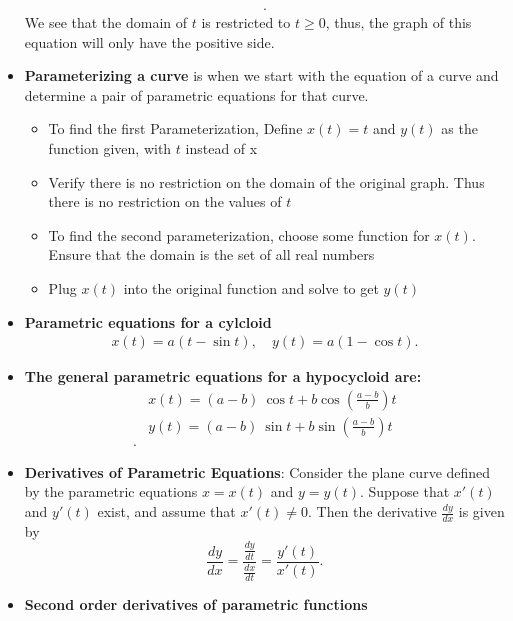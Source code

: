 \documentclass{report}
\begin{document}
\begin{itemize}
\begin{align*}
            .\end{align*}
            We see that the domain of $t$ is restricted to  $t \geq 0$, thus, the graph of this equation will only have the positive side.
        \item \textbf{Parameterizing a curve} is when we start with the equation of a curve and determine a pair of parametric equations for that curve.
            \begin{itemize}
                \item To find the first Parameterization, Define $x(t) = t $ and $y(t)$ as the function given, with $t$ instead of x 
                \item Verify there is no restriction on the domain of the original graph. Thus there is no restriction on the values of $t $
            \end{itemize}
            \begin{itemize}
                \item To find the second parameterization, choose some function for $x(t)$. Ensure that the domain is the set of all real numbers
                \item Plug $x(t)$ into the original function and solve to get $y(t)$
            \end{itemize}
        \item \textbf{Parametric equations for a cylcloid}
            \begin{align*}
                x(t) = a(t-\sin{t}), \quad y(t) = a(1-\cos{t})
            .\end{align*}
        \item \textbf{The general parametric equations for a hypocycloid are:}
            \begin{align*}
                &x(t) = (a-b)\ \cos{t} + b \cos{\left(\frac{a-b}{b}\right)}t \\
                &y(t) = (a-b)\ \sin{t} + b \sin{\left(\frac{a-b}{b}\right)}t \\
            .\end{align*}
        \item \textbf{Derivatives of Parametric Equations}:
            Consider the plane curve defined by the parametric equations \( x = x(t) \) and \( y = y(t) \). Suppose that \( x'(t) \) and \( y'(t) \) exist, and assume that \( x'(t) \neq 0 \). Then the derivative \( \frac{dy}{dx} \) is given by
            \[
                \frac{dy}{dx} = \frac{\frac{dy}{dt}}{\frac{dx}{dt}} = \frac{y'(t)}{x'(t)}.
            \]
        \item \textbf{Second order derivatives of parametric functions}

\end{itemize}
\end{document}
